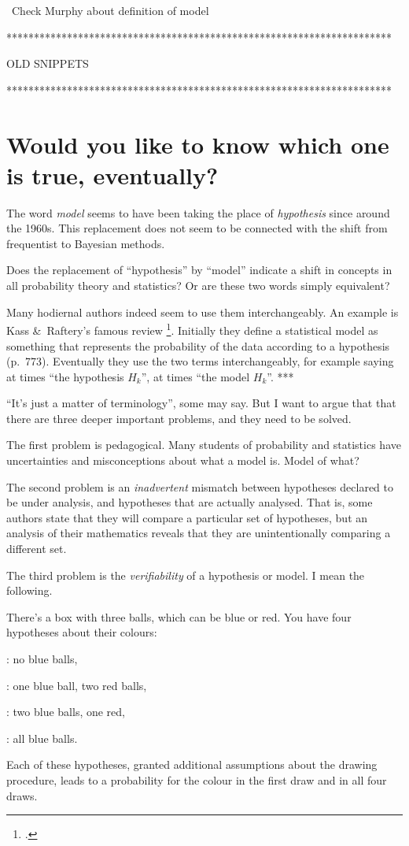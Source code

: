 \documentclass[\ifafour a4paper,12pt,\else a5paper,10pt,\fi%
onecolumn,oneside,article,%
british%
]{memoir}
\theoremstyle{remark}
\theoremstyle{innote}
\newcommand*{\citep}{\footcites}
\newcommand*{\amp}{\&}
\renewcommand*{\|}[1][]{\nonscript\:#1\vert\nonscript\:\mathopen{}}
\renewcommand*{\=}{\TextOrMath\texteq\eq}
\newcommand*{\puzzle}{{\fontencoding{U}\fontfamily{fontawesometwo}\selectfont\symbol{225}}}
\newcommand{\mynote}[1]{ {\color{notecolour}\puzzle\ #1}}
\begin{document}
\mynote{Check Murphy about definition of model}


**********************************************************************

OLD SNIPPETS

**********************************************************************

\section{Would you like to know which one is true, eventually?}
\label{sec:which}

The word \emph{model} seems to have been taking the place of
\emph{hypothesis} since around the 1960s. This replacement does not seem to
be connected with the shift from frequentist to Bayesian methods.

Does the replacement of \enquote{hypothesis} by \enquote{model} indicate a
shift in concepts in all probability theory and statistics? Or are these
two words simply equivalent?

Many hodiernal authors indeed seem to use them interchangeably. An example
is Kass \amp\ Raftery's famous review \citep{kassetal1995}. Initially they
define a statistical model as something that represents the probability of
the data according to a hypothesis (p.~773). Eventually they use the two
terms interchangeably, for example saying at times \enquote{the hypothesis
  $H_{k}$}, at times \enquote{the model $H_{k}$}. ***


\enquote{It's just a matter of terminology}, some may say. But I want to
argue that that there are three deeper important problems, and they need to
be solved.

The first problem is pedagogical. Many students of probability and statistics
have uncertainties and misconceptions about what a model is. Model of what?

The second problem is an \emph{inadvertent} mismatch between hypotheses
declared to be under analysis, and hypotheses that are actually analysed.
That is, some authors state that they will compare a particular set of
hypotheses, but an analysis of their mathematics reveals that they are
unintentionally comparing a different set.


The third problem is the \emph{verifiability} of a hypothesis or model. I
mean the following.


There's a box with three balls, which can be blue or red. You have four
hypotheses about their colours:
\begin{enumerate*}[label=$H_{\arabic*}$,start=0]
\item: no blue balls,
\item: one blue ball, two red balls,
\item: two blue balls, one red,
\item: all blue balls.
\end{enumerate*}
Each of these hypotheses, granted additional assumptions about the drawing
procedure, leads to a probability for the colour in the first draw and in
all four draws.
\end{document}
